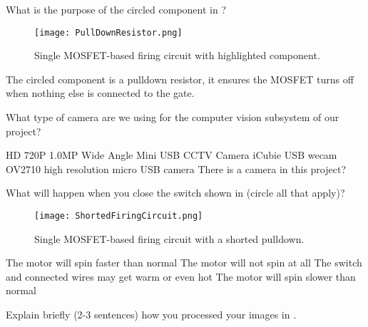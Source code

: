 \documentclass[addpoints,answers]{exam}
\begin{document}
\begin{questions}




\clearpage
\question
What is the purpose of the circled component in ?
\begin{figure}[h]
\centering
	\texttt{[image: PullDownResistor.png]}
	\caption{Single MOSFET-based firing circuit with highlighted component.}
	\label{fig:PullDownResistor}
\end{figure}
\begin{solution}[3in]
The circled component is a pulldown resistor, it ensures the MOSFET turns off when nothing else is connected to the gate. 
\end{solution}




\question
What type of camera are we using for the computer vision subsystem of our project?
\begin{choices}
\choice HD 720P 1.0MP Wide Angle Mini USB CCTV Camera
\CorrectChoice iCubie USB wecam
\choice OV2710 high resolution micro USB camera
\choice There is a camera in this project?
\end{choices}



\clearpage
\question
What will happen when you close the switch shown in  (circle all that apply)?
\begin{figure}[h]
\centering
	\texttt{[image: ShortedFiringCircuit.png]}
	\caption{Single MOSFET-based firing circuit with a shorted pulldown.}
	\label{fig:ShortedFiringCircuit}
\end{figure}
\begin{choices}
\choice The motor will spin faster than normal
\CorrectChoice The motor will not spin at all
\choice The switch and connected wires may get warm or even hot
\choice The motor will spin slower than normal 
\end{choices}




\question
Explain briefly (2-3 sentences) how you processed your images in \Matlab. 
\begin{solution}[3in]
\end{solution}

\end{questions}
\end{document}
